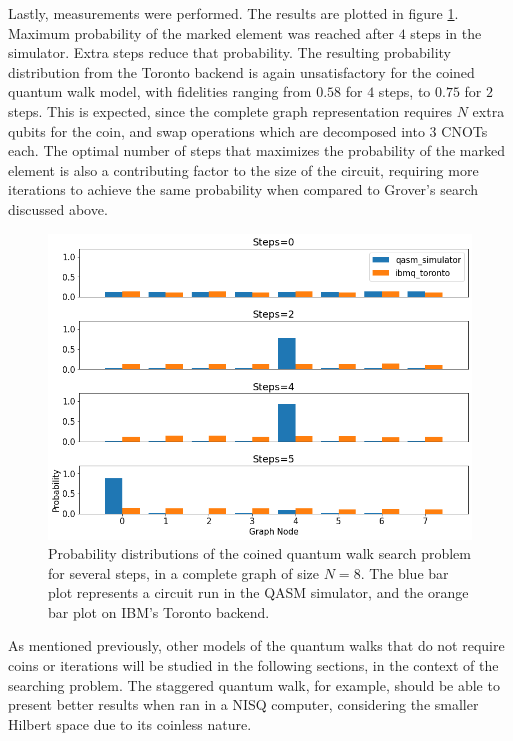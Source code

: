 \documentclass[../../dissertation.tex]{subfiles}
\begin{document}
Lastly, measurements were performed. The results are plotted in figure
\ref{fig:coinedSearchQiskitDist}. Maximum probability of the marked element was
reached after $4$ steps in the simulator. Extra steps reduce that probability.
The resulting probability distribution from the Toronto backend is again
unsatisfactory for the coined quantum walk model, with fidelities ranging from
$0.58$ for $4$ steps, to $0.75$ for $2$ steps. This is expected, since the
complete graph representation requires $N$ extra qubits for the coin, and swap
operations which are decomposed into $3$ CNOTs each. The optimal number of
steps that maximizes the probability of the marked element is also a
contributing factor to the size of the circuit, requiring more iterations to
achieve the same probability when compared to Grover's search discussed above. 
\begin{figure}[!h]
	\centering
	\includegraphics[scale=0.40]{img/Qiskit/CoinedQuantumWalk/Search/CoinedQiskitSearch_N3_M4_S0245}
	\caption{Probability distributions of the coined quantum walk search problem for several steps, in a complete graph of size $N=8$. The blue bar plot represents a circuit run in the QASM simulator, and the orange bar plot on IBM's Toronto backend.} 
	\label{fig:coinedSearchQiskitDist}
\end{figure}\par

As mentioned previously, other models of the quantum walks that do not require
coins or iterations will be studied in the following sections, in the context
of the searching problem. The staggered quantum walk, for example, should be
able to present better results when ran in a NISQ computer, considering the
smaller Hilbert space due to its coinless nature.
\end{document}
